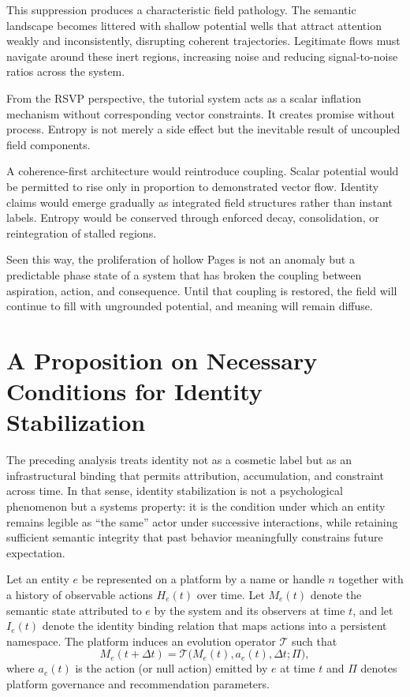 \documentclass[11pt,oneside]{article}
\begin{document}
This suppression produces a characteristic field pathology. The semantic landscape becomes littered with shallow potential wells that attract attention weakly and inconsistently, disrupting coherent trajectories. Legitimate flows must navigate around these inert regions, increasing noise and reducing signal-to-noise ratios across the system.

From the RSVP perspective, the tutorial system acts as a scalar inflation mechanism without corresponding vector constraints. It creates promise without process. Entropy is not merely a side effect but the inevitable result of uncoupled field components.

A coherence-first architecture would reintroduce coupling. Scalar potential would be permitted to rise only in proportion to demonstrated vector flow. Identity claims would emerge gradually as integrated field structures rather than instant labels. Entropy would be conserved through enforced decay, consolidation, or reintegration of stalled regions.

Seen this way, the proliferation of hollow Pages is not an anomaly but a predictable phase state of a system that has broken the coupling between aspiration, action, and consequence. Until that coupling is restored, the field will continue to fill with ungrounded potential, and meaning will remain diffuse.

\section{A Proposition on Necessary Conditions for Identity Stabilization}

The preceding analysis treats identity not as a cosmetic label but as an infrastructural binding that permits attribution, accumulation, and constraint across time. In that sense, identity stabilization is not a psychological phenomenon but a systems property: it is the condition under which an entity remains legible as ``the same'' actor under successive interactions, while retaining sufficient semantic integrity that past behavior meaningfully constrains future expectation.

Let an entity $e$ be represented on a platform by a name or handle $n$ together with a history of observable actions $H_e(t)$ over time. Let $M_e(t)$ denote the semantic state attributed to $e$ by the system and its observers at time $t$, and let $I_e(t)$ denote the identity binding relation that maps actions into a persistent namespace. The platform induces an evolution operator $\mathcal{T}$ such that
\[
M_e(t+\Delta t) = \mathcal{T}\big(M_e(t), a_e(t), \Delta t; \Pi\big),
\]
where $a_e(t)$ is the action (or null action) emitted by $e$ at time $t$ and $\Pi$ denotes platform governance and recommendation parameters.
\end{document}
